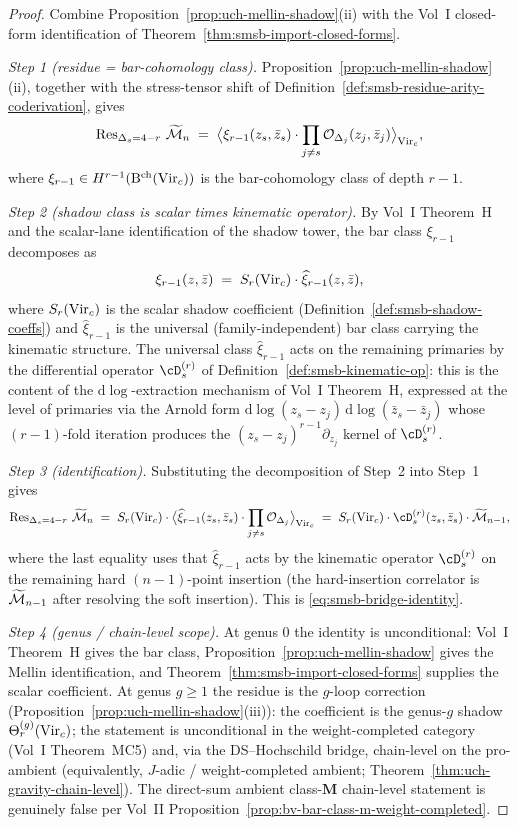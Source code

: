 \begin{proof}
Combine Proposition~\ref{prop:uch-mellin-shadow}(ii) with the Vol~I
closed-form identification of
Theorem~\ref{thm:smsb-import-closed-forms}.

\emph{Step 1 (residue = bar-cohomology class).}
Proposition~\ref{prop:uch-mellin-shadow}(ii), together with the
stress-tensor shift of
Definition~\ref{def:smsb-residue-arity-coderivation}, gives
\[
 \operatorname{Res}_{\Delta_s = 4 - r}\,\widetilde{\mathcal M}_n
 \;=\;
 \bigl\langle \xi_{r - 1}(z_s, \bar z_s)\cdot
 \prod_{j \neq s} \mathcal O_{\Delta_j}(z_j, \bar z_j)
 \bigr\rangle_{\mathrm{Vir}_c},
\]
where $\xi_{r - 1} \in H^{r - 1}(\mathrm B^{\mathrm{ch}}(\mathrm{Vir}_c))$ is the bar-cohomology
class of depth $r - 1$.

\emph{Step 2 (shadow class is scalar times kinematic operator).}
By Vol~I Theorem~H and the scalar-lane identification of the shadow
tower, the bar class $\xi_{r - 1}$ decomposes as
\[
 \xi_{r - 1}(z, \bar z)
 \;=\;
 S_r(\mathrm{Vir}_c)\cdot \widehat\xi_{r - 1}(z, \bar z),
\]
where $S_r(\mathrm{Vir}_c)$ is the scalar shadow coefficient
(Definition~\ref{def:smsb-shadow-coeffs}) and $\widehat\xi_{r - 1}$ is
the universal (family-independent) bar class carrying the kinematic
structure. The universal class $\widehat\xi_{r - 1}$ acts on the
remaining primaries by the differential operator $\cD_s^{(r)}$ of
Definition~\ref{def:smsb-kinematic-op}: this is the content of the
$\mathrm d \log$-extraction mechanism of Vol~I Theorem~H, expressed at
the level of primaries via the Arnold form
$\mathrm d \log(z_s - z_j)\,\mathrm d \log(\bar z_s - \bar z_j)$ whose
$(r - 1)$-fold iteration produces the
$(z_s - z_j)^{r - 1}\partial_{z_j}$ kernel of $\cD_s^{(r)}$.

\emph{Step 3 (identification).}
Substituting the decomposition of Step~2 into Step~1 gives
\[
 \Res_{\Delta_s = 4 - r}\,\Mel\cM_n
 \;=\;
 S_r(\Vir_c)\cdot
 \bigl\langle \widehat\xi_{r - 1}(z_s, \bar z_s)\cdot
 \prod_{j \neq s} \cO_{\Delta_j}
 \bigr\rangle_{\Vir_c}
 \;=\;
 S_r(\Vir_c)\cdot \cD_s^{(r)}(z_s, \bar z_s)\cdot \Mel\cM_{n - 1},
\]
where the last equality uses that $\widehat\xi_{r - 1}$ acts by the
kinematic operator $\cD_s^{(r)}$ on the remaining hard
$(n - 1)$-point insertion (the hard-insertion correlator is
$\widetilde{\mathcal M}_{n - 1}$ after resolving the soft insertion). This is
\eqref{eq:smsb-bridge-identity}.

\emph{Step 4 (genus / chain-level scope).}
At genus $0$ the identity is unconditional: Vol~I Theorem~H gives the
bar class, Proposition~\ref{prop:uch-mellin-shadow} gives the Mellin
identification, and Theorem~\ref{thm:smsb-import-closed-forms} supplies
the scalar coefficient. At genus $g \geq 1$ the residue is the $g$-loop
correction (Proposition~\ref{prop:uch-mellin-shadow}(iii)): the
coefficient is the genus-$g$ shadow $\Theta_r^{(g)}(\mathrm{Vir}_c)$; the
statement is unconditional in the weight-completed category (Vol~I
Theorem~MC5) and, via the DS--Hochschild bridge, chain-level on the
pro-ambient (equivalently, $J$-adic / weight-completed ambient;
Theorem~\ref{thm:uch-gravity-chain-level}). The direct-sum ambient
class-$\mathbf M$ chain-level statement is genuinely false per Vol~II
Proposition~\ref{prop:bv-bar-class-m-weight-completed}.
\end{proof}

